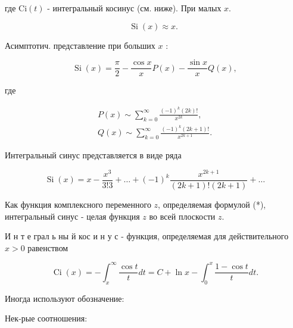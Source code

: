 \documentclass[10pt]{article}
\begin{document}
где $\mathrm{Ci}(t)$ - интегральный косинус (см. ниже). При малых $x$.



\[

\operatorname{Si}(x) \approx x \text {. }

\]



Асимптотич. представление при больших $x$ :



\[

\operatorname{Si}(x)=\frac{\pi}{2}-\frac{\cos x}{x} P(x)-\frac{\sin x}{x} Q(x),

\]



где



\[

\begin{gathered}

P(x) \sim \sum_{k=0}^{\infty} \frac{(-1)^{k}(2 k) !}{x^{2 k}}, \\

Q(x) \sim \sum_{k=0}^{\infty} \frac{(-1)^{k}(2 k+1) !}{x^{2 k+1}} .

\end{gathered}

\]



Интегральный синус представляется в виде ряда



\[

\operatorname{Si}(x)=x-\frac{x^{3}}{3 ! 3}+\ldots+(-1)^{k} \frac{x^{2 k+1}}{(2 k+1) !(2 k+1)}+\ldots

\]



Как функция комплексного переменного $z$, определяемая формулой (*), интегральный синус - целая функция $z$ во всей плоскости $z$.



И н т е грал ь ны й кос и н у с - функция, определяемая для действительного $x>0$ равенством



\[

\operatorname{Ci}(x)=-\int_{x}^{\infty} \frac{\cos t}{t} d t=C+\ln x-\int_{0}^{x} \frac{1-\cos t}{t} d t .

\]



Иногда используют обозначение:



Нек-рые соотношения:
\end{document}
